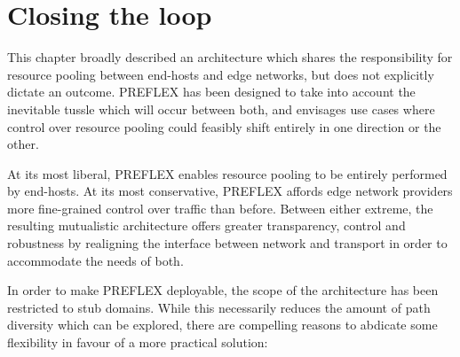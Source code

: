 \section{Closing the loop}

This chapter broadly described an architecture which shares the responsibility for resource pooling between end-hosts and edge networks, but does not explicitly dictate an outcome. \ac{PREFLEX} has been designed to take into account the inevitable tussle which will occur between both, and envisages use cases where control over resource pooling could feasibly shift entirely in one direction or the other. 

At its most liberal, \ac{PREFLEX} enables resource pooling to be entirely performed by end-hosts. At its most conservative, \ac{PREFLEX} affords edge network providers more fine-grained control over traffic than before. Between either extreme, the resulting mutualistic architecture offers greater transparency, control and robustness by realigning the interface between network and transport in order to accommodate the needs of both.

In order to make \ac{PREFLEX} deployable, the scope of the architecture has been restricted to stub domains.
While this necessarily reduces the amount of path diversity which can be explored, there are compelling reasons to abdicate some flexibility in favour of a more practical solution:

